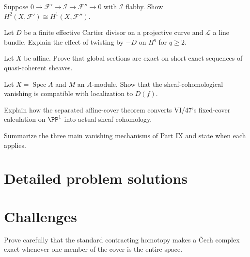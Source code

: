\begin{problem}\label{prob:vi49-07}
Suppose $0\to\mathcal F'\to\mathcal I\to\mathcal F''\to0$ with $\mathcal I$ flabby. Show $H^2(X,\mathcal F')\cong H^1(X,\mathcal F'')$.
\end{problem}

\begin{problem}\label{prob:vi49-08}
Let $D$ be a finite effective Cartier divisor on a projective curve and $\mathcal L$ a line bundle. Explain the effect of twisting by $-D$ on $H^q$ for $q\ge2$.
\end{problem}

\begin{problem}\label{prob:vi49-09}
Let $X$ be affine. Prove that global sections are exact on short exact sequences of quasi-coherent sheaves.
\end{problem}

\begin{problem}\label{prob:vi49-10}
Let $X=\operatorname{Spec}A$ and $M$ an $A$-module. Show that the sheaf-cohomological vanishing is compatible with localization to $D(f)$.
\end{problem}

\begin{problem}\label{prob:vi49-11}
Explain how the separated affine-cover theorem converts VI/47's fixed-cover calculation on $\PP^1$ into actual sheaf cohomology.
\end{problem}

\begin{problem}\label{prob:vi49-12}
Summarize the three main vanishing mechanisms of Part IX and state when each applies.
\end{problem}

\ifdefined\FullProblemDossiers
\section{Detailed problem solutions}

\fi

\section{Challenges}
\begin{problem}[Challenge]\label{chal:vi49-01}
Prove carefully that the standard contracting homotopy makes a Čech complex exact whenever one member of the cover is the entire space.
\end{problem}


